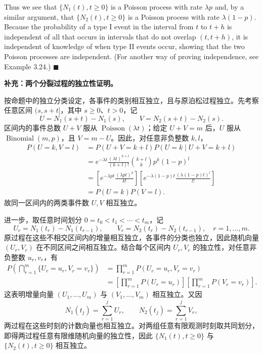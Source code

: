 \documentclass[12pt,a4paper]{article}
\begin{document}
Thus we see that $\{N_1(t), t \ge 0\}$ is a Poisson process with rate $\lambda p$ and, by a similar argument, that $\{N_2(t), t \ge 0\}$ is a Poisson process with rate $\lambda(1-p)$. Because the probability of a type I event in the interval from $t$ to $t+h$ is independent of all that occurs in intervals that do not overlap $(t,t+h)$, it is independent of knowledge of when type II events occur, showing that the two Poisson processes are independent. (For another way of proving independence, see Example 3.24.) \hfill$\blacksquare$

\begin{answerbox}
\textbf{补充：两个分裂过程的独立性证明。}

按命题中的独立分类设定，各事件的类别相互独立，且与原泊松过程独立。先考察任意区间 $(s,s+t]$，其中 $s\geq0$、$t>0$，记
$$
U=N_1(s+t)-N_1(s),\qquad
V=N_2(s+t)-N_2(s).
$$
区间内的事件总数 $U+V$ 服从 $\operatorname{Poisson}(\lambda t)$；给定 $U+V=m$ 后，$U$ 服从 $\operatorname{Binomial}(m,p)$，且 $V=m-U$。因此，对任意非负整数 $k,l$，
$$
\begin{aligned}
P(U=k,V=l)
&=P(U+V=k+l)P(U=k\mid U+V=k+l)\\
&=e^{-\lambda t}\frac{(\lambda t)^{k+l}}{(k+l)!}
  \binom{k+l}{k}p^k(1-p)^l\\
&=\left[e^{-\lambda pt}\frac{(\lambda pt)^k}{k!}\right]
  \left[e^{-\lambda(1-p)t}\frac{(\lambda(1-p)t)^l}{l!}\right]\\
&=P(U=k)P(V=l).
\end{aligned}
$$
故同一区间内的两类事件数 $U,V$ 相互独立。

进一步，取任意时间划分 $0=t_0<t_1<\cdots<t_m$，记
$$
U_r=N_1(t_r)-N_1(t_{r-1}),\qquad
V_r=N_2(t_r)-N_2(t_{r-1}),\quad r=1,\ldots,m.
$$
原过程在这些不相交区间内的增量相互独立，各事件的分类也独立，因此随机向量 $(U_r,V_r)$ 在不同区间之间相互独立。结合每个区间内 $U_r,V_r$ 的独立性，对任意非负整数 $u_r,v_r$，有
$$
\begin{aligned}
P\left(\bigcap_{r=1}^{m}\{U_r=u_r,V_r=v_r\}\right)
&=\prod_{r=1}^{m}P(U_r=u_r,V_r=v_r)\\
&=\left[\prod_{r=1}^{m}P(U_r=u_r)\right]
  \left[\prod_{r=1}^{m}P(V_r=v_r)\right].
\end{aligned}
$$
这表明增量向量 $(U_1,\ldots,U_m)$ 与 $(V_1,\ldots,V_m)$ 相互独立。又因
$$
N_1(t_j)=\sum_{r=1}^{j}U_r,\qquad
N_2(t_j)=\sum_{r=1}^{j}V_r,
$$
两过程在这些时刻的计数向量也相互独立。对两组任意有限观测时刻取共同划分，即得两过程任意有限维随机向量的独立性，因此 $\{N_1(t),t\geq0\}$ 与 $\{N_2(t),t\geq0\}$ 相互独立。
\end{answerbox}
\end{document}
